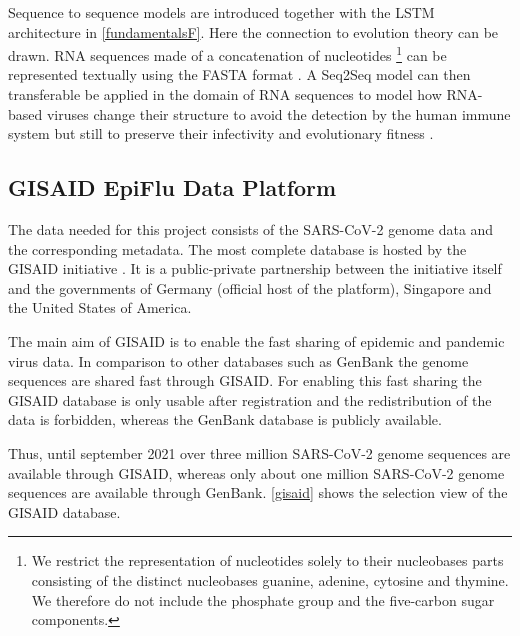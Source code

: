 Sequence to sequence models are introduced together with the \ac{LSTM} architecture in \autoref{fundamentalsF}. Here the connection to evolution theory can be drawn. \ac{RNA} sequences made of a concatenation of nucleotides \footnote{We restrict the representation of nucleotides solely to their nucleobases parts consisting of the distinct nucleobases guanine, adenine, cytosine and thymine. We therefore do not include the phosphate group and the five-carbon sugar components.} can be represented textually using the FASTA format \cite{cockBiopythonFreelyAvailable2009}. A \ac{Seq2Seq} model can then transferable be applied in the domain of \ac{RNA} sequences to model how \ac{RNA}-based viruses change their structure to avoid the detection by the human immune system but still to preserve their infectivity and evolutionary fitness \cite{Hie2021}. 

\subsection{GISAID EpiFlu Data Platform} \label{fundamentalsC}

The data needed for this project consists of the \ac{SARS-CoV-2} genome data and the corresponding metadata. The most complete database is hosted by the \ac{GISAID} initiative \cite{Gisaid2021}. It is a public-private partnership between the initiative itself and the governments of Germany (official host of the platform), Singapore and the United States of America. \cite{gisaideditorGISAID2021}

The main aim of \ac{GISAID} is to enable the fast sharing of epidemic and pandemic virus data. In comparison to other databases such as GenBank the genome sequences are shared fast through \ac{GISAID}. For enabling this fast sharing the \ac{GISAID} database is only usable after registration and the redistribution of the data is forbidden, whereas the GenBank database is publicly available. \cite{shuGISAIDGlobalInitiative2017}

Thus, until september 2021 over three million \ac{SARS-CoV-2} genome sequences are available through \ac{GISAID}, whereas only about one million \ac{SARS-CoV-2} genome sequences are available through GenBank. \autoref{gisaid} shows the selection view of the \ac{GISAID} database. \cite{gisaideditorGISAID2021, nationallibraryofmedicinencbieditorNCBISARSCoV2Resources}

